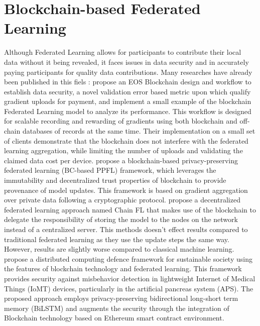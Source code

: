 \documentclass{article}
\begin{document}
\section{Blockchain-based Federated Learning}
Although Federated Learning allows for participants to contribute their local data without it being revealed, it faces issues in data security and in accurately paying participants for quality data contributions. Many researches have already been published in this fiels : 
\newline \newline \cite{martinez_record_2019} propose an EOS Blockchain design and workflow to establish data security, a novel validation error based metric upon which \cite{martinez_record_2019} qualify gradient uploads for payment, and implement a small example of the blockchain Federated Learning model to analyze its performance. This workflow is designed for scalable recording and rewarding of gradients using both blockchain and off-chain databases of records at the same time. Their implementation on a small set of clients demonstrate that the blockchain does not interfere with the federated learning aggregation, while limiting the number of uploads and validating the claimed data cost per device. 
\newline \newline \cite{awan_poster_2019} propose a blockchain-based privacy-preserving federated learning (BC-based PPFL) framework, which leverages the immutability and decentralized trust properties of blockchain to provide provenance of model updates. This framework is based on gradient aggregation over private data following a cryptographic protocol.
\newline \newline \cite{korkmaz_chainfl_2020} propose a decentralized federated learning approach named Chain FL that makes use of the blockchain to delegate the responsibility of storing the model to the nodes on the network instead of a centralized server. This methods doesn’t effect results compared to traditional federated learning as they use the update steps the same way. However, results are slightly worse compared to classical machine learning.
\newline \newline \cite{sharma_2020} propose a distributed computing defence framework for sustainable society using the features of blockchain technology and federated learning. This framework provides security against misbehavior detection in lightweight Internet of Medical Things (IoMT) devices, particularly in the artificial pancreas system (APS). The proposed approach employs privacy-preserving bidirectional long-short term memory (BiLSTM) and augments the security through the integration of Blockchain technology based on Ethereum smart contract environment.
\end{document}
